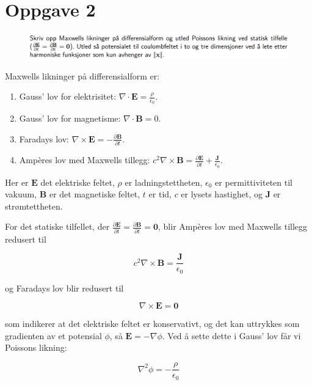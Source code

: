 \section{Oppgave 2}

\begin{figure}[H]
    \centering
    \includegraphics[width=0.7 \textwidth]{./02.png}
    \caption{}
    \label{fig:02}
\end{figure}
Maxwells likninger på differensialform er:

\begin{enumerate}
\item Gauss' lov for elektrisitet: $\nabla \cdot \mathbf{E} = \frac{\rho}{\epsilon_0}$.
\item Gauss' lov for magnetisme: $\nabla \cdot \mathbf{B} = 0$.
\item Faradays lov: $\nabla \times \mathbf{E} = -\frac{\partial \mathbf{B}}{\partial t}$.
\item Ampères lov med Maxwells tillegg: $c^2 \nabla \times \mathbf{B} = \frac{\partial \mathbf{E}}{\partial t} + \frac{\mathbf{J}}{\epsilon_0}$.
\end{enumerate}

Her er $\mathbf{E}$ det elektriske feltet, $\rho$ er ladningstettheten, $\epsilon_0$ er permittiviteten til vakuum, $\mathbf{B}$ er det magnetiske feltet, $t$ er tid, $c$ er lysets hastighet, og $\mathbf{J}$ er strømtettheten.

For det statiske tilfellet, der $\frac{\partial \mathbf{E}}{\partial t}=\frac{\partial \mathbf{B}}{\partial t}=\mathbf{0}$, blir Ampères lov med Maxwells tillegg redusert til

\begin{equation*}
c^2 \nabla \times \mathbf{B} = \frac{\mathbf{J}}{\epsilon_0}
\end{equation*}

og Faradays lov blir redusert til

\begin{equation*}
\nabla \times \mathbf{E} = \mathbf{0}
\end{equation*}

som indikerer at det elektriske feltet er konservativt, og det kan uttrykkes som gradienten av et potensial $\phi$, så $\mathbf{E} = -\nabla \phi$. Ved å sette dette i Gauss' lov får vi Poissons likning:

\begin{equation*}
\nabla^2 \phi = - \frac{\rho}{\epsilon_0}
\end{equation*}

